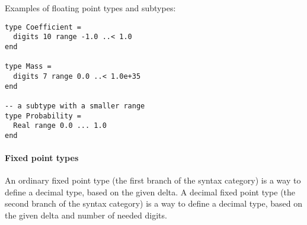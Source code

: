 \example Examples of floating point types and subtypes:
\begin{lstlisting}
type Coefficient = 
  digits 10 range -1.0 ..< 1.0 
end

type Mass =
  digits 7 range 0.0 ..< 1.0e+35 
end

-- a subtype with a smaller range
type Probability = 
  Real range 0.0 ... 1.0
end 
\end{lstlisting}

\paragraph{Fixed point types}
An ordinary fixed point type (the first branch of the  syntax category) is a way to define a decimal type, based on the given delta. 
A decimal fixed point type (the second branch of the  syntax category) is a way to define a decimal type, based on the given delta and number of needed digits.  

